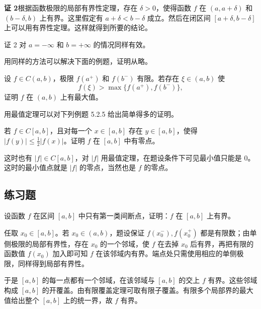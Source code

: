 \begin{xproof}
\textbf{证 2}\quad 根据函数极限的局部有界性定理，存在 $\delta>0$，使得函数 $f$ 在 $(a,a+\delta)$ 和 $(b-\delta,b)$ 上有界。这里假定有 $a+\delta<b-\delta$ 成立。然后在闭区间 $[a+\delta,b-\delta]$ 上可以用有界性定理。这样就得到所要的结论。
\end{xproof}

\begin{xremark}
证 2 对 $a=-\infty$ 和 $b=+\infty$ 的情况同样有效。
\end{xremark}

用同样的方法可以解决下面的例题，证明从略。

\begin{xexample}[5.3.4]
设 $f\in C(a,b)$，极限 $f(a^+)$ 和 $f(b^-)$ 有限。若存在 $\xi\in(a,b)$ 使
\[
  f(\xi)>\max\{f(a^+),f(b^-)\},
\]
证明 $f$ 在 $(a,b)$ 上有最大值。
\end{xexample}

用最值定理可以对下列例题 5.2.5 给出简单得多的证明。

\begin{xexample}[5.3.5]
若 $f\in C[a,b]$，且对每一个 $x\in[a,b]$ 存在 $y\in[a,b]$，使得 $|f(y)|\le\frac12|f(x)|$。证明 $f$ 在 $[a,b]$ 中有零点。
\end{xexample}
\begin{xproof}
这时也有 $|f|\in C[a,b]$，对 $|f|$ 用最值定理，在题设条件下可见最小值只能是 0。这时的最小值点就是 $|f|$ 的零点，当然也是 $f$ 的零点。
\end{xproof}

\subsection{练习题}

\begin{xexercise}[1]
设函数 $f$ 在区间 $[a,b]$ 中只有第一类间断点，证明：$f$ 在 $[a,b]$ 上有界。
\end{xexercise}
\begin{xsolution}
任取 $x_0\in[a,b]$。若 $x_0\in(a,b)$，题设保证 $f(x_0^-),f(x_0^+)$ 都是有限数；由单侧极限的局部有界性，存在 $x_0$ 的一个邻域，使 $f$ 在去掉 $x_0$ 后有界，再把有限的函数值 $f(x_0)$ 加入即可知 $f$ 在该邻域内有界。端点处只需使用相应的单侧极限，同样得到局部有界性。

于是 $[a,b]$ 的每一点都有一个邻域，在该邻域与 $[a,b]$ 的交上 $f$ 有界。这些邻域构成 $[a,b]$ 的开覆盖。由有限覆盖定理可取有限子覆盖。有限多个局部界的最大值给出整个 $[a,b]$ 上的统一界，故 $f$ 有界。
\end{xsolution}


